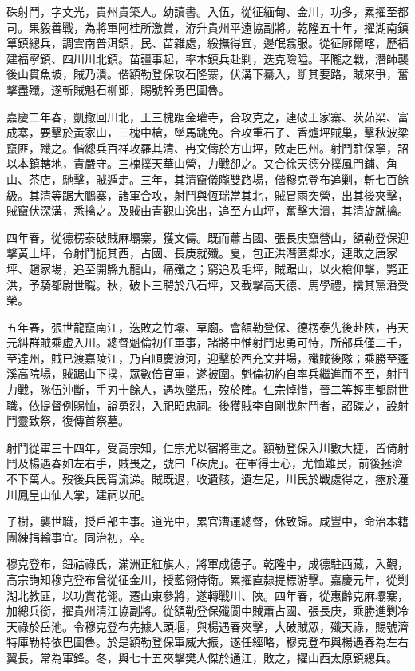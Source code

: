 \begin{pinyinscope}
硃射鬥，字文光，貴州貴築人。幼讀書。入伍，從征緬甸、金川，功多，累擢至都司。果毅善戰，為將軍阿桂所激賞，洊升貴州平遠協副將。乾隆五十年，擢湖南鎮筸鎮總兵，調雲南普洱鎮，民、苗雜處，綏撫得宜，邊氓翕服。從征廓爾喀，歷福建福寧鎮、四川川北鎮。苗疆事起，率本鎮兵赴剿，迭克險隘。平隴之戰，潛師襲後山貫魚坡，賊乃潰。偕額勒登保攻石隆寨，伏溝下驀入，斷其要路，賊來爭，奮擊盡殲，遂斬賊魁石柳鄧，賜號幹勇巴圖魯。

嘉慶二年春，凱撤回川北，王三槐踞金瓘寺，合攻克之，連破王家寨、茨茹梁、富成寨，要擊於黃家山，三槐中槍，墜馬跳免。合攻重石子、香爐坪賊巢，擊秋波梁竄匪，殲之。偕總兵百祥攻羅其清、冉文儔於方山坪，敗走巴州。射鬥駐保寧，詔以本鎮轄地，責嚴守。三槐撲天華山營，力戰卻之。又合徐天德分撲風門鋪、角山、茶店，馳擊，賊遁走。三年，其清竄儀隴雙路場，偕穆克登布追剿，斬七百餘級。其清等踞大鵬寨，諸軍合攻，射鬥與恆瑞當其北，賊冒雨突營，出其後夾擊，賊竄伏深溝，悉擒之。及賊由青觀山逸出，追至方山坪，奮擊大潰，其清旋就擒。

四年春，從德楞泰破賊麻壩寨，獲文儔。既而蕭占國、張長庚竄營山，額勒登保迎擊黃土坪，令射鬥扼其西，占國、長庚就殲。夏，包正洪潛匿鄰水，連敗之唐家坪、趙家場，追至開縣九龍山，痛殲之；窮追及毛坪，賊踞山，以火槍仰擊，斃正洪，予騎都尉世職。秋，破卜三聘於八石坪，又截擊高天德、馬學禮，擒其黨潘受榮。

五年春，張世龍竄南江，迭敗之竹壩、草廟。會額勒登保、德楞泰先後赴陜，冉天元糾群賊乘虛入川。總督魁倫初任軍事，諸將中惟射鬥忠勇可恃，所部兵僅二千，至達州，賊已渡嘉陵江，乃自順慶渡河，迎擊於西充文井場，殲賊後隊；乘勝至蓬溪高院場，賊踞山下撲，眾數倍官軍，遂被圍。魁倫初約自率兵繼進而不至，射鬥力戰，隊伍沖斷，手刃十餘人，遇坎墜馬，歿於陣。仁宗悼惜，晉二等輕車都尉世職，依提督例賜恤，謚勇烈，入祀昭忠祠。後獲賊李自剛戕射鬥者，詔磔之，設射鬥靈致祭，復傳首祭墓。

射鬥從軍三十四年，受高宗知，仁宗尤以宿將重之。額勒登保入川數大捷，皆倚射鬥及楊遇春如左右手，賊畏之，號曰「硃虎」。在軍得士心，尤恤難民，前後拯濟不下萬人。歿後兵民胥流涕。賊既退，收遺骸，遺左足，川民於戰處得之，瘞於潼川鳳皇山仙人掌，建祠以祀。

子樹，襲世職，授戶部主事。道光中，累官漕運總督，休致歸。咸豐中，命治本籍團練捐輸事宜。同治初，卒。

穆克登布，鈕祜祿氏，滿洲正紅旗人，將軍成德子。乾隆中，成德駐西藏，入覲，高宗詢知穆克登布曾從征金川，授藍翎侍衛。累擢直隸提標游擊。嘉慶元年，從剿湖北教匪，以功賞花翎。遷山東參將，遂轉戰川、陜。四年春，從惠齡克麻壩寨，加總兵銜，擢貴州清江協副將。從額勒登保殲閬中賊蕭占國、張長庚，乘勝進剿冷天祿於岳池。令穆克登布先據人頭堰，與楊遇春夾擊，大破賊眾，殲天祿，賜號濟特庫勒特依巴圖魯。於是額勒登保軍威大振，遂任經略，穆克登布與楊遇春為左右翼長，常為軍鋒。冬，與七十五夾擊樊人傑於通江，敗之，擢山西太原鎮總兵。


\end{pinyinscope}
